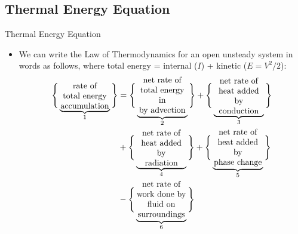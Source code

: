 \subsection{Thermal Energy Equation}
\begin{frame}{Thermal Energy Equation}

\begin{itemize}
	\item We can write the  Law of Thermodynamics for an open unsteady system in words as follows, where total energy = internal ($I$) + kinetic ($E=V^2/2$): 
	\begin{align*}
	\Bigg \{\underbrace{\parbox{6em}{\centering rate of\\ total energy\\accumulation}}_{1}\Bigg\} &= \Bigg \{\underbrace{\parbox{6em}{\centering net rate of\\total energy in\\by advection}}_{2}\Bigg \} + \Bigg \{\underbrace{\parbox{6em}{\centering net rate of\\heat added by\\conduction}}_{3}\Bigg \} \\&+ \Bigg \{\underbrace{\parbox{6em}{\centering net rate of\\heat added by\\radiation}}_{4}\Bigg \} + \Bigg \{\underbrace{\parbox{6em}{\centering net rate of\\heat added by\\phase change}}_{5}\Bigg \}\\
    &- \Bigg \{\underbrace{\parbox{6em}{\centering net rate of\\work done by\\fluid on surroundings}}_{6}\Bigg \}
	\end{align*}
\end{itemize}
\end{frame}
